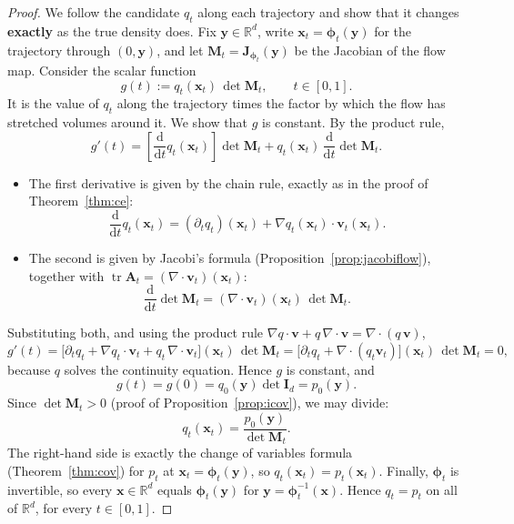 \documentclass[11pt,a4paper]{article}
\numberwithin{equation}{section}     %
\theoremstyle{plain}        %
\theoremstyle{definition}   %
\theoremstyle{remark}       %
\begin{document}
\begin{proof}
We follow the candidate $q_t$ along each trajectory and show that it changes \textbf{exactly} as the true density does. Fix $\mathbf{y}\in\mathbb{R}^d$, write $\mathbf{x}_t=\boldsymbol{\phi}_t(\mathbf{y})$ for the trajectory through $(0,\mathbf{y})$, and let $\mathbf{M}_t=\mathbf{J}_{\boldsymbol{\phi}_t}(\mathbf{y})$ be the Jacobian of the flow map. Consider the scalar function
\[
g(t):=q_t(\mathbf{x}_t)\,\det\mathbf{M}_t,\qquad t\in[0,1].
\]
It is the value of $q_t$ along the trajectory times the factor by which the flow has stretched volumes around it. We show that $g$ is constant. By the product rule,
\[
g'(t)=\left[\frac{\mathrm{d}}{\mathrm{d}t}q_t(\mathbf{x}_t)\right]\det\mathbf{M}_t+q_t(\mathbf{x}_t)\,\frac{\mathrm{d}}{\mathrm{d}t}\det\mathbf{M}_t .
\]
\begin{itemize}
\item The first derivative is given by the chain rule, exactly as in the proof of Theorem~\ref{thm:ce}:
\[
\frac{\mathrm{d}}{\mathrm{d}t}q_t(\mathbf{x}_t)=\left(\partial_t q_t\right)(\mathbf{x}_t)+\nabla q_t(\mathbf{x}_t)\cdot\mathbf{v}_t(\mathbf{x}_t).
\]
\item The second is given by Jacobi's formula (Proposition~\ref{prop:jacobiflow}), together with $\operatorname{tr}\mathbf{A}_t=(\nabla\cdot\mathbf{v}_t)(\mathbf{x}_t)$:
\[
\frac{\mathrm{d}}{\mathrm{d}t}\det\mathbf{M}_t=\left(\nabla\cdot\mathbf{v}_t\right)(\mathbf{x}_t)\,\det\mathbf{M}_t .
\]
\end{itemize}
Substituting both, and using the product rule $\nabla q\cdot\mathbf{v}+q\,\nabla\cdot\mathbf{v}=\nabla\cdot(q\,\mathbf{v})$,
\[
g'(t)=\Big[\partial_t q_t+\nabla q_t\cdot\mathbf{v}_t+q_t\,\nabla\cdot\mathbf{v}_t\Big](\mathbf{x}_t)\,\det\mathbf{M}_t
=\Big[\partial_t q_t+\nabla\cdot\left(q_t\mathbf{v}_t\right)\Big](\mathbf{x}_t)\,\det\mathbf{M}_t=0,
\]
because $q$ solves the continuity equation. Hence $g$ is constant, and
\[
g(t)=g(0)=q_0(\mathbf{y})\det\mathbf{I}_d=p_0(\mathbf{y}).
\]
Since $\det\mathbf{M}_t>0$ (proof of Proposition~\ref{prop:icov}), we may divide:
\[
q_t(\mathbf{x}_t)=\frac{p_0(\mathbf{y})}{\det\mathbf{M}_t} .
\]
The right-hand side is exactly the change of variables formula (Theorem~\ref{thm:cov}) for $p_t$ at $\mathbf{x}_t=\boldsymbol{\phi}_t(\mathbf{y})$, so $q_t(\mathbf{x}_t)=p_t(\mathbf{x}_t)$. Finally, $\boldsymbol{\phi}_t$ is invertible, so every $\mathbf{x}\in\mathbb{R}^d$ equals $\boldsymbol{\phi}_t(\mathbf{y})$ for $\mathbf{y}=\boldsymbol{\phi}_t^{-1}(\mathbf{x})$. Hence $q_t=p_t$ on all of $\mathbb{R}^d$, for every $t\in[0,1]$.
\end{proof}
\end{document}
